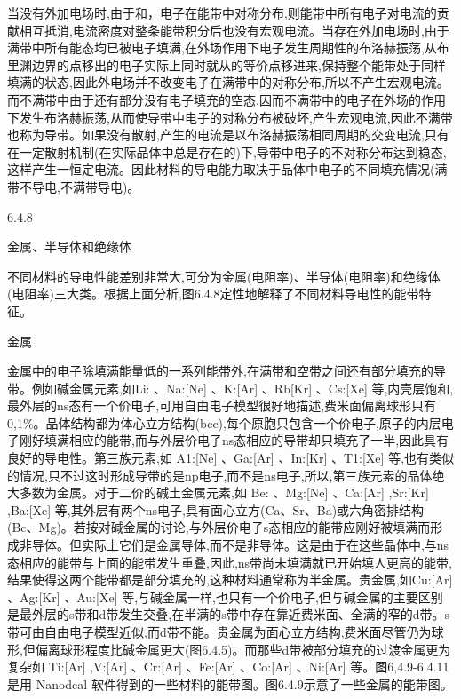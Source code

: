 当没有外加电场时,由于和，电子在能带中对称分布,则能带中所有电子对电流的贡献相互抵消,电流密度对整条能带积分后也没有宏观电流。当存在外加电场时,由于满带中所有能态均已被电子填满,在外场作用下电子发生周期性的布洛赫振荡,从布里渊边界的点移出的电子实际上同时就从的等价点移进来,保持整个能带处于同样填满的状态,因此外电场并不改变电子在满带中的对称分布,所以不产生宏观电流。而不满带中由于还有部分没有电子填充的空态,因而不满带中的电子在外场的作用下发生布洛赫振荡,从而使导带中电子的对称分布被破坏,产生宏观电流,因此不满带也称为导带。如果没有散射,产生的电流是以布洛赫振荡相同周期的交变电流,只有在一定散射机制(在实际品体中总是存在的)下,导带中电子的不对称分布达到稳态,这样产生一恒定电流。因此材料的导电能力取决于品体中电子的不同填充情况(满带不导电,不满带导电)。

6.4.8

金属、半导体和绝缘体

不同材料的导电性能差别非常大,可分为金属(电阻率)、半导体(电阻率)和绝缘体(电阻率)三大类。根据上面分析,图6.4.8定性地解释了不同材料导电性的能带特征。



金属

金属中的电子除填满能量低的一系列能带外,在满带和空带之间还有部分填充的导带。例如碱金属元素,如Li: 、Na:[Ne] 、K:[Ar] 、Rb[Kr] 、Cs:[Xe] 等,内壳层饱和,最外层的ns态有一个价电子,可用自由电子模型很好地描述,费米面偏离球形只有0,1\%。品体结构都为体心立方结构(bcc),每个原胞只包含一个价电子,原子的内层电子刚好填满相应的能带,而与外层价电子ns态相应的导带却只填充了一半,因此具有良好的导电性。第三族元素,如 A1:[Ne] 、Ga:[Ar] 、In:[Kr] 、T1:[Xe] 等,也有类似的情况,只不过这时形成导带的是np电子,而不是ns电子,所以,第三族元素的品体绝大多数为金属。对于二价的碱土金属元素,如 Be: 、Mg:[Ne] 、Ca:[Ar] ,Sr:[Kr]  ,Ba:[Xe]  等,其外层有两个ns电子,具有面心立方(Ca、Sr、Ba)或六角密排结构(Bc、Mg)。若按对碱金属的讨论,与外层价电子s态相应的能带应刚好被填满而形成非导体。但实际上它们是金属导体,而不是非导体。这是由于在这些晶体中,与ns态相应的能带与上面的能带发生重叠,因此,ns带尚未填满就已开始填人更高的能带,结果使得这两个能带都是部分填充的,这种材料通常称为半金属。贵金属,如Cu:[Ar] 、Ag:[Kr] 、Au:[Xe] 等,与碱金属一样,也只有一个价电子,但与碱金属的主要区别是最外层的s带和d带发生交叠,在半满的s带中存在靠近费米面、全满的窄的d带。s带可由自由电子模型近似,而d带不能。贵金属为面心立方结构,费米面尽管仍为球形,但偏离球形程度比碱金属更大(图6.4.5)。而那些d带被部分填充的过渡金属更为复杂如 Ti:[Ar] ,V:[Ar] 、Cr:[Ar] 、Fe:[Ar] 、Co:[Ar] 、Ni:[Ar] 等。图6,4.9-6.4.11是用 Nanodcal 软件得到的一些材料的能带图。图6.4.9示意了一些金属的能带图。



